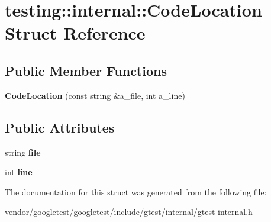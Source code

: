 \hypertarget{structtesting_1_1internal_1_1_code_location}{}\section{testing\+:\+:internal\+:\+:Code\+Location Struct Reference}
\label{structtesting_1_1internal_1_1_code_location}
\subsection*{Public Member Functions}
\begin{DoxyCompactItemize}
\item 
\mbox{\label{structtesting_1_1internal_1_1_code_location_ade3ecb2a54905619cd40a6856b48cd5a}} 
{\bfseries Code\+Location} (const string \&a\+\_\+file, int a\+\_\+line)
\end{DoxyCompactItemize}
\subsection*{Public Attributes}
\begin{DoxyCompactItemize}
\item 
\mbox{\label{structtesting_1_1internal_1_1_code_location_ab8a24d5e63295e411d37578dbb9427c0}} 
string {\bfseries file}
\item 
\mbox{\label{structtesting_1_1internal_1_1_code_location_a01c977c7e8834a05a6d6c40b0c416045}} 
int {\bfseries line}
\end{DoxyCompactItemize}


The documentation for this struct was generated from the following file\+:\begin{DoxyCompactItemize}
\item 
vendor/googletest/googletest/include/gtest/internal/gtest-\/internal.\+h\end{DoxyCompactItemize}
